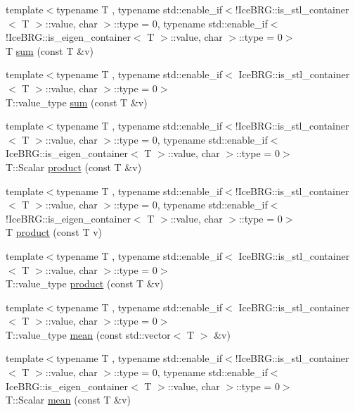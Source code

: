 \begin{DoxyCompactItemize}
\item 
{\footnotesize template$<$typename T , typename std\-::enable\-\_\-if$<$!\-Ice\-B\-R\-G\-::is\-\_\-stl\-\_\-container$<$ T $>$\-::value, char $>$\-::type  = 0, typename std\-::enable\-\_\-if$<$!\-Ice\-B\-R\-G\-::is\-\_\-eigen\-\_\-container$<$ T $>$\-::value, char $>$\-::type  = 0$>$ }\\T \hyperlink{namespaceIceBRG_a0ebf8d347cd03981dc41cd75cd391841}{sum} (const T \&v)
\item 
{\footnotesize template$<$typename T , typename std\-::enable\-\_\-if$<$ Ice\-B\-R\-G\-::is\-\_\-stl\-\_\-container$<$ T $>$\-::value, char $>$\-::type  = 0$>$ }\\T\-::value\-\_\-type \hyperlink{namespaceIceBRG_ab90ec04fd5d0d17b2987abbe753c34f2}{sum} (const T \&v)
\item 
{\footnotesize template$<$typename T , typename std\-::enable\-\_\-if$<$!\-Ice\-B\-R\-G\-::is\-\_\-stl\-\_\-container$<$ T $>$\-::value, char $>$\-::type  = 0, typename std\-::enable\-\_\-if$<$ Ice\-B\-R\-G\-::is\-\_\-eigen\-\_\-container$<$ T $>$\-::value, char $>$\-::type  = 0$>$ }\\T\-::\-Scalar \hyperlink{namespaceIceBRG_a57a9ced2b9bb6a12c9c663ba5650ba2c}{product} (const T \&v)
\item 
{\footnotesize template$<$typename T , typename std\-::enable\-\_\-if$<$!\-Ice\-B\-R\-G\-::is\-\_\-stl\-\_\-container$<$ T $>$\-::value, char $>$\-::type  = 0, typename std\-::enable\-\_\-if$<$!\-Ice\-B\-R\-G\-::is\-\_\-eigen\-\_\-container$<$ T $>$\-::value, char $>$\-::type  = 0$>$ }\\T \hyperlink{namespaceIceBRG_a5b006e2f5c04b43666cb2dba51da57d8}{product} (const T v)
\item 
{\footnotesize template$<$typename T , typename std\-::enable\-\_\-if$<$ Ice\-B\-R\-G\-::is\-\_\-stl\-\_\-container$<$ T $>$\-::value, char $>$\-::type  = 0$>$ }\\T\-::value\-\_\-type \hyperlink{namespaceIceBRG_a54b40ae345b36c4f89d3a8ff5f260b1d}{product} (const T \&v)
\item 
{\footnotesize template$<$typename T , typename std\-::enable\-\_\-if$<$ Ice\-B\-R\-G\-::is\-\_\-stl\-\_\-container$<$ T $>$\-::value, char $>$\-::type  = 0$>$ }\\T\-::value\-\_\-type \hyperlink{namespaceIceBRG_abbbe4951d6842fd1ab32f5185b166290}{mean} (const std\-::vector$<$ T $>$ \&v)
\item 
{\footnotesize template$<$typename T , typename std\-::enable\-\_\-if$<$!\-Ice\-B\-R\-G\-::is\-\_\-stl\-\_\-container$<$ T $>$\-::value, char $>$\-::type  = 0, typename std\-::enable\-\_\-if$<$ Ice\-B\-R\-G\-::is\-\_\-eigen\-\_\-container$<$ T $>$\-::value, char $>$\-::type  = 0$>$ }\\T\-::\-Scalar \hyperlink{namespaceIceBRG_a0216ec77f9ca493d99f2588328e5077e}{mean} (const T \&v)

\end{DoxyCompactItemize}
